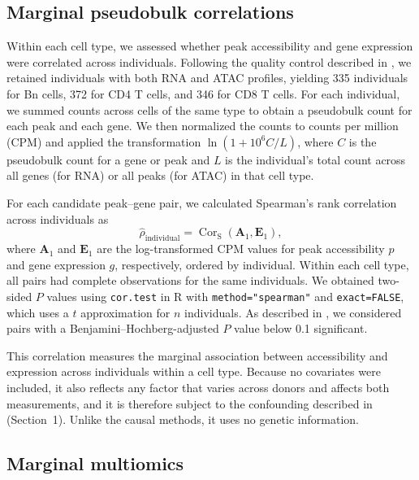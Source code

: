 \subsection{Marginal pseudobulk correlations}
\label{sec:pseudobulk-correlations}

Within each cell type, we assessed whether peak accessibility and gene expression were correlated across individuals. Following the quality control described in , we retained individuals with both RNA and ATAC profiles, yielding 335 individuals for Bn cells, 372 for CD4 T cells, and 346 for CD8 T cells. For each individual, we summed counts across cells of the same type to obtain a pseudobulk count for each peak and each gene. We then normalized the counts to counts per million (CPM) and applied the transformation $\ln(1+10^6 C/L)$, where $C$ is the pseudobulk count for a gene or peak and $L$ is the individual's total count across all genes (for RNA) or all peaks (for ATAC) in that cell type.

\noindent For each candidate peak--gene pair, we calculated Spearman's rank correlation across individuals as
\begin{equation*}
\widehat{\rho}_{\mathrm{individual}}
= \operatorname{Cor}_{\mathrm{S}}(\boldsymbol{A}_1,\boldsymbol{E}_1),
\end{equation*}
where $\boldsymbol{A}_1$ and $\boldsymbol{E}_1$ are the log-transformed CPM values for peak accessibility $p$ and gene expression $g$, respectively, ordered by individual. Within each cell type, all pairs had complete observations for the same individuals. We obtained two-sided $P$ values using \texttt{cor.test} in R with \texttt{method="spearman"} and \texttt{exact=FALSE}, which uses a $t$ approximation for $n$ individuals. As described in , we considered pairs with a Benjamini--Hochberg-adjusted $P$ value below 0.1 significant.

\noindent This correlation measures the marginal association between accessibility and expression across individuals within a cell type. Because no covariates were included, it also reflects any factor that varies across donors and affects both measurements, and it is therefore subject to the confounding described in  (Section~1). Unlike the causal methods, it uses no genetic information.


\subsection{Marginal multiomics}
\label{sec:wnn-correlations}

